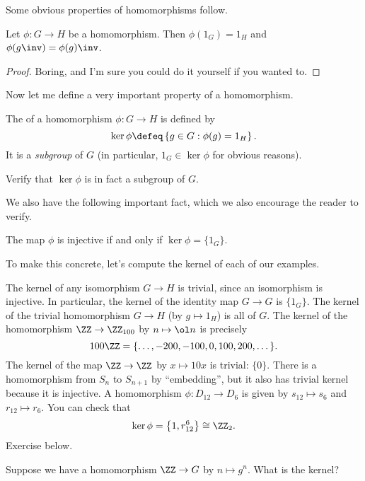 Some obvious properties of homomorphisms follow.
\begin{fact}
	Let $\phi : G \to H$ be a homomorphism.
	Then $\phi(1_G) = 1_H$ and $\phi(g\inv) = \phi(g)\inv$.
\end{fact}
\begin{proof}
	Boring, and I'm sure you could do it yourself if you wanted to.
\end{proof}

Now let me define a very important property of a homomorphism.
\begin{definition}
	The  of a homomorphism $\phi : G \to H$ is defined by
	\[ \ker \phi 
	\defeq
		\left\{ g \in G : \phi(g) = 1_H \right\}.
		\]
	It is a \emph{subgroup} of $G$ (in particular, $1_G \in \ker \phi$ for obvious reasons).
\end{definition}
\begin{ques}
	Verify that $\ker\phi$ is in fact a subgroup of $G$.
\end{ques}
We also have the following important fact, which we also encourage the reader to verify.
\begin{proposition}
	The map $\phi$ is injective if and only if $\ker\phi = \{1_G\}$.
\end{proposition}

To make this concrete, let's compute the kernel of each of our examples.
\begin{example}
	\listhack
	\begin{enumerate}[(a)]
		\ii The kernel of any isomorphism $G \to H$ is trivial,
		since an isomorphism is injective.
		In particular, the kernel of the identity map $G \to G$ is $\{1_G\}$.
		\ii The kernel of the trivial homomorphism $G \to H$ (by $g \mapsto 1_H$) is all of $G$.
		\ii The kernel of the homomorphism $\ZZ \to \Zc{100}$ by $n \mapsto \ol n$
		is precisely \[ 100\ZZ = \{\dots, -200, -100, 0, 100, 200, \dots \}. \]
		\ii The kernel of the map $\ZZ \to \ZZ$ by $x \mapsto 10x$ is trivial: $\{0\}$.
		\ii There is a homomorphism from $S_n$ to $S_{n+1}$ by ``embedding'',
		but it also has trivial kernel because it is injective.
		\ii A homomorphism $\phi: D_{12} \to D_6$ is given by $s_{12} \mapsto s_6$ and $r_{12} \mapsto r_6$.  
		You can check that
		\[ \ker \phi = \left\{ 1, r_{12}^{6} \right\} \cong \Zc2. \]
		\ii Exercise below.
	\end{enumerate}
\end{example}
\begin{exercise}
	Suppose we have a homomorphism $\ZZ \to G$ by $n \mapsto g^n$.
	What is the kernel?
\end{exercise}

